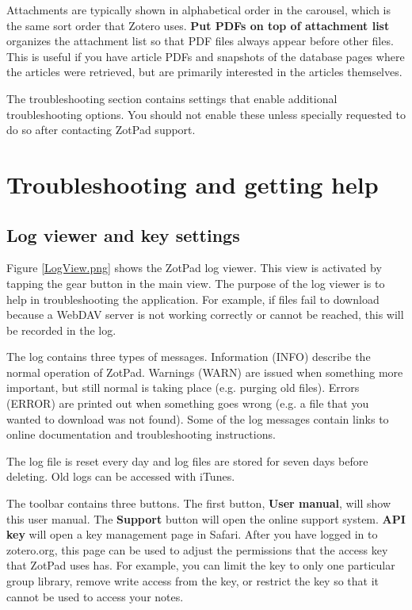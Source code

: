 \documentclass[oneside, openany, 12pt]{tufte-book}
\newcommand{\ipad}[1]{}
\newcommand{\image}[2]{
	\center
	\fbox{\texttt{[image: images/iPhone/\{\#2]}}}

	\refstepcounter{figure}
	\smallskip\noindent\small Figure \thefigure: #1
	\label{#2}
	}
\newcommand{\ipadfootnote}[1]{}
\newcommand{\ipad}[1]{#1}
\newcommand{\image}[2]{
	\caption{#1}
	\label{#2}
	\fbox{\texttt{[image: images/iPad/\{\#2]}}}
	}
\newcommand{\ipadfootnote}[1]{\footnote{#1}}
\begin{document}
Attachments are typically shown in alphabetical order in the carousel, which is the same sort order that Zotero uses. \textbf{Put PDFs on top of attachment list} organizes the  attachment list so that PDF files always appear before other files. This is useful if you have article PDFs and snapshots of the database pages where the articles were retrieved, but are primarily interested in the articles themselves.

The troubleshooting section contains settings that enable additional troubleshooting options. You should not enable these unless specially requested to do so after contacting ZotPad support.

\begin{figure}
\image{Advanced ZotPad settings}{AdvancedSettings.png}
\end{figure}

\chapter{Troubleshooting and getting help}

\section{Log viewer and key settings}

Figure \ref{LogView.png} shows the ZotPad log viewer. This view is activated by tapping the gear button in the main view. The purpose of the log viewer is to help in troubleshooting the application. For example, if files fail to download because a WebDAV server is not working correctly or cannot be reached, this will be recorded in the log.

The log contains three types of messages. Information (INFO) describe the normal operation of ZotPad. Warnings (WARN) are issued when something more important, but still normal is taking place (e.g. purging old files). Errors (ERROR) are printed out when something goes wrong (e.g. a file that you wanted to download was not found). Some of the log messages contain links to online documentation and troubleshooting instructions.

\begin{figure}
\image{ZotPad log viewer}{LogView.png}
\end{figure}

The log file is reset every day and log files are stored for seven days before deleting. Old logs can be accessed with iTunes. 

The toolbar contains three buttons. The first button, \textbf{User manual}, will show this user manual. The \textbf{Support} button will open the online support system\ipadfootnote{ZotPad uses UserVoice for support and knowledge base. UserVoice can be accessed also with a browser\\*\url{http://zotpad.uservoice.com}}. \textbf{\ipad{Manage }API key} will open a key management page in Safari. After you have logged in to zotero.org, this page can be used to adjust the permissions that the access key that ZotPad uses has. For example, you can limit the key to only one particular group library, remove write access from the key, or restrict the key so that it cannot be used to access your notes.
\end{document}

